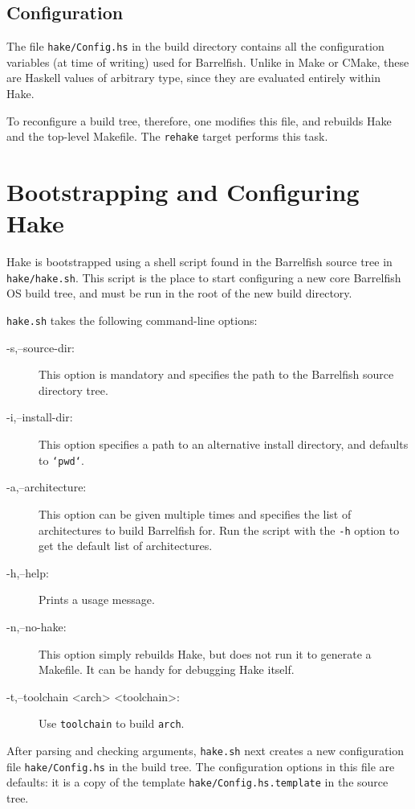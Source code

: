 \documentclass[a4paper,twoside]{report} %
\begin{document}
\section{Configuration}

The file \texttt{hake/Config.hs} in the build directory contains all
the configuration variables (at time of writing) used for Barrelfish.
Unlike in Make or CMake, these are Haskell values of arbitrary type,
since they are evaluated entirely within Hake.

To reconfigure a build tree, therefore, one modifies this file,
and rebuilds Hake and the top-level Makefile.
The \texttt{rehake} target performs this task.

\chapter{Bootstrapping and Configuring Hake}

Hake is bootstrapped using a shell script found in the Barrelfish
source tree in \texttt{hake/hake.sh}.  This script is the place to
start configuring a new core Barrelfish OS build tree, and must be
run in the root of the new build directory.

\texttt{hake.sh} takes the following command-line options:
\begin{description}
\item[-s,--source-dir:] This option is mandatory and specifies the
  path to the Barrelfish source directory tree.
\item[-i,--install-dir:] This option specifies a path to an
  alternative install directory, and defaults to \texttt{`pwd`}.
\item[-a,--architecture:] This option can be given multiple times and
  specifies the list of architectures to build Barrelfish for.  Run
  the script with the \texttt{-h} option to get the default list of
  architectures.
\item[-h,--help:] Prints a usage message.
\item[-n,--no-hake:] This option simply rebuilds Hake, but does not
  run it to generate a Makefile. It can be handy for debugging Hake
  itself.
\item[-t,--toolchain <arch> <toolchain>:] Use \texttt{toolchain} to build
  \texttt{arch}.
\end{description}

After parsing and checking arguments, \texttt{hake.sh} next creates a new
configuration file \texttt{hake/Config.hs} in the build tree.   The
configuration options in this file are defaults: it is a copy of the
template \texttt{hake/Config.hs.template} in the source tree.
\end{document}
